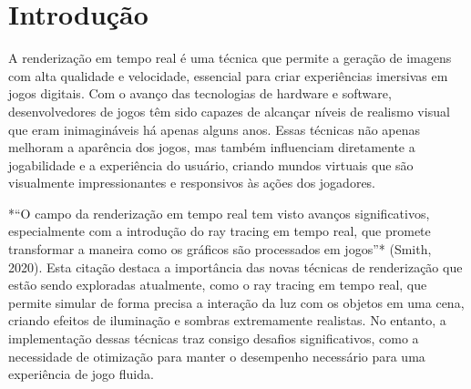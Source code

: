 \documentclass[a4paper,brazil,ruledheader,normaltoc,capchap,twoside,openany]{abnt_pucmg_utf8}
\begin{document}
\tableofcontents

\onehalfspacing

\setcounter{page}{7}

\chapter{Introdução}

A renderização em tempo real é uma técnica que permite a geração de imagens com alta qualidade e velocidade, essencial para criar experiências imersivas em jogos digitais. Com o avanço das tecnologias de hardware e software, desenvolvedores de jogos têm sido capazes de alcançar níveis de realismo visual que eram inimagináveis há apenas alguns anos. Essas técnicas não apenas melhoram a aparência dos jogos, mas também influenciam diretamente a jogabilidade e a experiência do usuário, criando mundos virtuais que são visualmente impressionantes e responsivos às ações dos jogadores.

*“O campo da renderização em tempo real tem visto avanços significativos, especialmente com a introdução do ray tracing em tempo real, que promete transformar a maneira como os gráficos são processados em jogos”* (Smith, 2020). Esta citação destaca a importância das novas técnicas de renderização que estão sendo exploradas atualmente, como o ray tracing em tempo real, que permite simular de forma precisa a interação da luz com os objetos em uma cena, criando efeitos de iluminação e sombras extremamente realistas. No entanto, a implementação dessas técnicas traz consigo desafios significativos, como a necessidade de otimização para manter o desempenho necessário para uma experiência de jogo fluida.









\renewcommand{\bibname}{Referências}
\printbibliography


%

%
\end{document}
